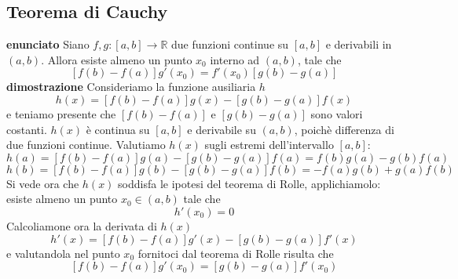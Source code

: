 \documentclass[a4paper, 9pt]{report}
\begin{document}
\subsection*{Teorema di Cauchy}
\textbf{enunciato}\newline
Siano $f,g : [a,b] \rightarrow \mathbb{R}$ due funzioni continue su $[a,b]$ e derivabili in $(a,b)$. Allora esiste almeno un punto $x_0$ interno ad $(a,b)$, tale che 
\[
    [f(b) -f(a)] g'(x_0) = f'(x_0) [g(b) -g(a)]
\]
\textbf{dimostrazione}\newline
Consideriamo la funzione ausiliaria $h$
\[
    h(x) = [f(b) -f(a)]g(x) - [g(b) - g(a)]f(x)
\]
e teniamo presente che $[f(b) - f(a)]$ e $[g(b) - g(a)]$ sono valori costanti.\newline
$h(x)$ è continua su $[a,b]$ e derivabile su $(a,b)$, poichè differenza di due funzioni continue.\newline
Valutiamo $h(x)$  sugli estremi dell'intervallo $[a,b]$:
\[
    h(a) = [f(b)- f(a)]g(a) - [g(b)- g(a)] f(a) = f(b)g(a) - g(b)f(a) 
\]
\[
    h(b) = [f(b) - f(a)]g(b)- [g(b)- g(a)]f(b) = -f(a) g(b) + g(a)f(b)
\]
Si vede ora che $h(x)$ soddisfa le ipotesi del teorema di Rolle, applichiamolo: esiste almeno un punto $x_0 \in (a,b)$ tale che 
\[
    h'(x_0) = 0
\]
Calcoliamone ora la derivata di $h(x)$
\[
    h'(x) = [f(b) - f(a)]g'(x) - [g(b) - g(a)]f'(x)
\]
e valutandola nel punto $x_0$ fornitoci dal teorema di Rolle risulta che
\[
    [f(b)- f(a)]g'(x_0) = [g(b) - g(a)]f'(x_0)
\]






\newpage
\end{document}
